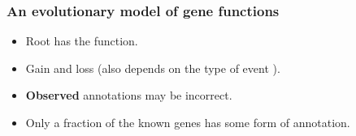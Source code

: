 \documentclass[aspectratio=169, 9pt]{beamer}
\begin{document}
\begin{frame}[label=aphylographicalview,c]
\frametitle{An evolutionary model of gene functions}
\def\shadowsize{2pt}

\begin{minipage}[m]{.60\linewidth}
\begin{figure}
	\footnotesize
	\centering
	\def\svgwidth{.9\linewidth}
\end{figure}
\end{minipage}
\hfill
\begin{minipage}[m]{.38\linewidth}
	\pause
	\begin{itemize}
		\item \textcolor{rootnode}{Root has the function.}\pause[4]
		\item \textcolor{innernode}{Gain\pause{} and loss\pause{} (also depends on the type of event \hyperlink{duplicationvsspeciation}{}}).\pause
		\item \textcolor{leafnode}{\textbf{Observed} annotations may be incorrect.}\pause
		\item Only a fraction of the known genes has some form of annotation.
	\end{itemize}
\end{minipage}

\end{frame}

\newcommand{\oinclude}[2]{\only<#1>{\texttt{[image: \#2]}}}
\end{document}
